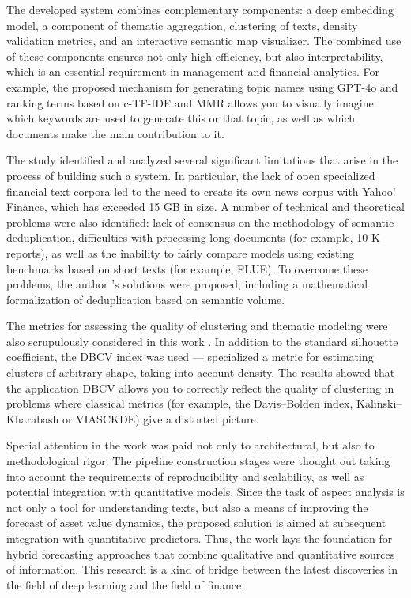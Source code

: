 The developed system combines complementary components: a deep embedding model,
a component of thematic aggregation, clustering of texts, density validation metrics, and
an interactive semantic map visualizer. The combined use of these components ensures not only high
efficiency, but also interpretability, which is an essential requirement in management and financial
analytics. For example, the proposed mechanism for generating topic names using GPT-4o and ranking
terms based on c-TF-IDF and MMR allows you to visually imagine which keywords are used to generate
this or that topic, as well as which documents make the main contribution to it.

The study identified and analyzed several significant limitations that arise
in the process of building such a system. In particular, the lack of open specialized
financial text corpora led to the need to create its own news corpus with Yahoo! Finance,
which has exceeded 15 GB in size. A number of technical and theoretical problems were also identified: lack
of consensus on the methodology of semantic deduplication, difficulties with processing long documents (for example,
10-K reports), as well as the inability to fairly compare models using existing benchmarks
based on short texts (for example, FLUE). To overcome these problems, the author
's solutions were proposed, including a mathematical formalization of deduplication based on semantic volume.

The metrics for assessing the quality of clustering and thematic modeling were also scrupulously considered in this work
. In addition to the standard silhouette coefficient, the DBCV index was used --- specialized
a metric for estimating clusters of arbitrary shape, taking into account density. The results showed that the application
DBCV allows you to correctly reflect the quality of clustering in problems where classical metrics (for example,
the Davis–Bolden index, Kalinski–Kharabash or VIASCKDE) give a distorted picture.

Special attention in the work was paid not only to architectural, but also to methodological rigor.
The pipeline construction stages were thought out taking into account the requirements of reproducibility and scalability, as well as
potential integration with quantitative models. Since the task of aspect analysis is not only
a tool for understanding texts, but also a means of improving the forecast of asset value dynamics, the proposed
solution is aimed at subsequent integration with quantitative predictors. Thus, the work lays
the foundation for hybrid forecasting approaches that combine qualitative and quantitative sources
of information. This research is a kind of bridge between the latest discoveries in the field of deep
learning and the field of finance.

